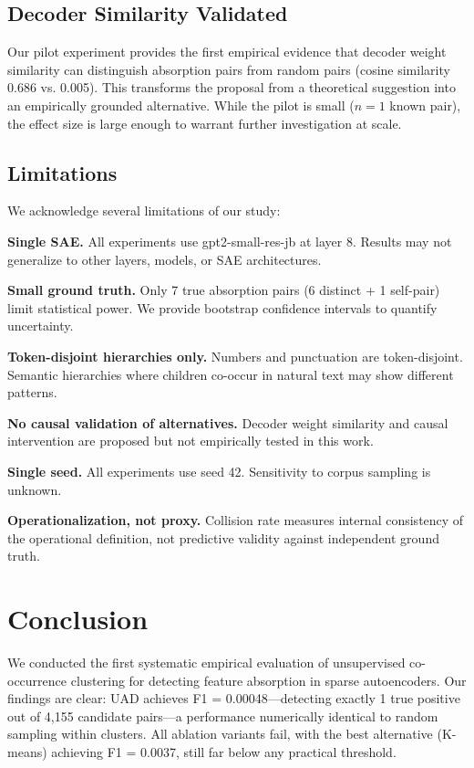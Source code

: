 \documentclass{article}
\begin{document}
\subsection{Decoder Similarity Validated}

Our pilot experiment provides the first empirical evidence that decoder weight similarity can distinguish absorption pairs from random pairs (cosine similarity 0.686 vs. 0.005). This transforms the proposal from a theoretical suggestion into an empirically grounded alternative. While the pilot is small ($n = 1$ known pair), the effect size is large enough to warrant further investigation at scale.

\subsection{Limitations}

We acknowledge several limitations of our study:

\textbf{Single SAE.} All experiments use gpt2-small-res-jb at layer 8. Results may not generalize to other layers, models, or SAE architectures.

\textbf{Small ground truth.} Only 7 true absorption pairs (6 distinct + 1 self-pair) limit statistical power. We provide bootstrap confidence intervals to quantify uncertainty.

\textbf{Token-disjoint hierarchies only.} Numbers and punctuation are token-disjoint. Semantic hierarchies where children co-occur in natural text may show different patterns.

\textbf{No causal validation of alternatives.} Decoder weight similarity and causal intervention are proposed but not empirically tested in this work.

\textbf{Single seed.} All experiments use seed 42. Sensitivity to corpus sampling is unknown.

\textbf{Operationalization, not proxy.} Collision rate measures internal consistency of the operational definition, not predictive validity against independent ground truth.

\section{Conclusion}
\label{sec:conclusion}

We conducted the first systematic empirical evaluation of unsupervised co-occurrence clustering for detecting feature absorption in sparse autoencoders. Our findings are clear: UAD achieves F1 = 0.00048---detecting exactly 1 true positive out of 4,155 candidate pairs---a performance numerically identical to random sampling within clusters. All ablation variants fail, with the best alternative (K-means) achieving F1 = 0.0037, still far below any practical threshold.
\end{document}
